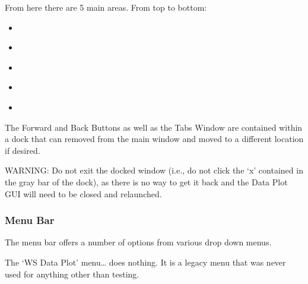 \documentclass[letterpaper,10pt,english]{sphinxmanual}
\begin{document}
From here there are 5 main areas. From top to bottom:
\begin{itemize}
\item {} 
{\hyperref[\detokenize{content/data_plot/main_window:menu-bar}]{}}

\item {} 
{\hyperref[\detokenize{content/data_plot/main_window:forward-and-back-buttons}]{}}

\item {} 
{\hyperref[\detokenize{content/data_plot/main_window:tabs-window}]{}}

\item {} 
{\hyperref[\detokenize{content/data_plot/main_window:plot-window}]{}}

\item {} 
{\hyperref[\detokenize{content/data_plot/main_window:toolbar}]{}}

\end{itemize}

The Forward and Back Buttons as well as the Tabs Window are contained within a dock that can removed from the main window and moved to a different location if desired.

WARNING: Do not exit the docked window (i.e., do not click the ‘x’ contained in the gray bar of the dock), as there is no way to get it back and the Data Plot GUI will need to be closed and relaunched.


\subsubsection{Menu Bar}
\label{\detokenize{content/data_plot/main_window:menu-bar}}\label{\detokenize{content/data_plot/main_window:id1}}
\begin{figure}[htbp]
\centering

\noindent{}
\end{figure}

The menu bar offers a number of options from various drop down menus.

The ‘WS Data Plot’ menu… does nothing. It is a legacy menu that was never used for anything other than testing.
\end{document}
